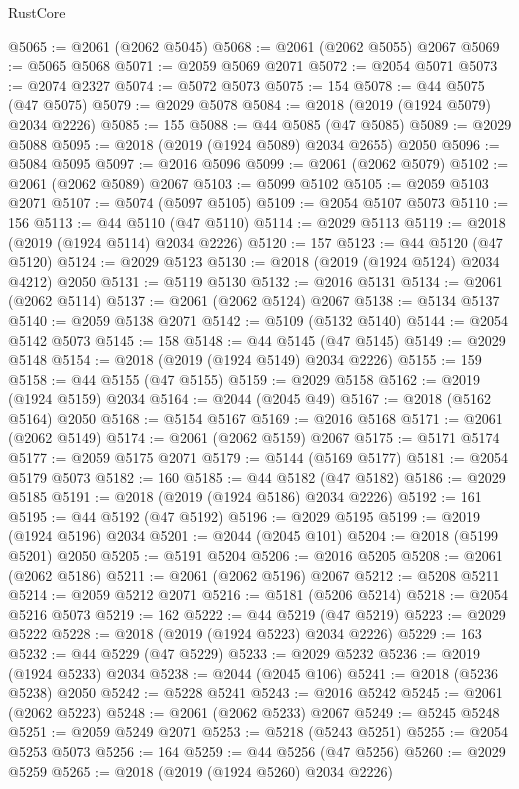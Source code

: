 \begin{lexlean}{RustCore}
\begin{coremodule}
@5065 := @2061 (@2062 @5045)
@5068 := @2061 (@2062 @5055) @2067
@5069 := @5065 @5068
@5071 := @2059 @5069 @2071
@5072 := @2054 @5071
@5073 := @2074 @2327
@5074 := @5072 @5073
@5075 := 154
@5078 := @44 @5075 (@47 @5075)
@5079 := @2029 @5078
@5084 := @2018 (@2019 (@1924 @5079) @2034 @2226)
@5085 := 155
@5088 := @44 @5085 (@47 @5085)
@5089 := @2029 @5088
@5095 := @2018 (@2019 (@1924 @5089) @2034 @2655) @2050
@5096 := @5084 @5095
@5097 := @2016 @5096
@5099 := @2061 (@2062 @5079)
@5102 := @2061 (@2062 @5089) @2067
@5103 := @5099 @5102
@5105 := @2059 @5103 @2071
@5107 := @5074 (@5097 @5105)
@5109 := @2054 @5107 @5073
@5110 := 156
@5113 := @44 @5110 (@47 @5110)
@5114 := @2029 @5113
@5119 := @2018 (@2019 (@1924 @5114) @2034 @2226)
@5120 := 157
@5123 := @44 @5120 (@47 @5120)
@5124 := @2029 @5123
@5130 := @2018 (@2019 (@1924 @5124) @2034 @4212) @2050
@5131 := @5119 @5130
@5132 := @2016 @5131
@5134 := @2061 (@2062 @5114)
@5137 := @2061 (@2062 @5124) @2067
@5138 := @5134 @5137
@5140 := @2059 @5138 @2071
@5142 := @5109 (@5132 @5140)
@5144 := @2054 @5142 @5073
@5145 := 158
@5148 := @44 @5145 (@47 @5145)
@5149 := @2029 @5148
@5154 := @2018 (@2019 (@1924 @5149) @2034 @2226)
@5155 := 159
@5158 := @44 @5155 (@47 @5155)
@5159 := @2029 @5158
@5162 := @2019 (@1924 @5159) @2034
@5164 := @2044 (@2045 @49)
@5167 := @2018 (@5162 @5164) @2050
@5168 := @5154 @5167
@5169 := @2016 @5168
@5171 := @2061 (@2062 @5149)
@5174 := @2061 (@2062 @5159) @2067
@5175 := @5171 @5174
@5177 := @2059 @5175 @2071
@5179 := @5144 (@5169 @5177)
@5181 := @2054 @5179 @5073
@5182 := 160
@5185 := @44 @5182 (@47 @5182)
@5186 := @2029 @5185
@5191 := @2018 (@2019 (@1924 @5186) @2034 @2226)
@5192 := 161
@5195 := @44 @5192 (@47 @5192)
@5196 := @2029 @5195
@5199 := @2019 (@1924 @5196) @2034
@5201 := @2044 (@2045 @101)
@5204 := @2018 (@5199 @5201) @2050
@5205 := @5191 @5204
@5206 := @2016 @5205
@5208 := @2061 (@2062 @5186)
@5211 := @2061 (@2062 @5196) @2067
@5212 := @5208 @5211
@5214 := @2059 @5212 @2071
@5216 := @5181 (@5206 @5214)
@5218 := @2054 @5216 @5073
@5219 := 162
@5222 := @44 @5219 (@47 @5219)
@5223 := @2029 @5222
@5228 := @2018 (@2019 (@1924 @5223) @2034 @2226)
@5229 := 163
@5232 := @44 @5229 (@47 @5229)
@5233 := @2029 @5232
@5236 := @2019 (@1924 @5233) @2034
@5238 := @2044 (@2045 @106)
@5241 := @2018 (@5236 @5238) @2050
@5242 := @5228 @5241
@5243 := @2016 @5242
@5245 := @2061 (@2062 @5223)
@5248 := @2061 (@2062 @5233) @2067
@5249 := @5245 @5248
@5251 := @2059 @5249 @2071
@5253 := @5218 (@5243 @5251)
@5255 := @2054 @5253 @5073
@5256 := 164
@5259 := @44 @5256 (@47 @5256)
@5260 := @2029 @5259
@5265 := @2018 (@2019 (@1924 @5260) @2034 @2226)

\end{coremodule}
\end{lexlean}
